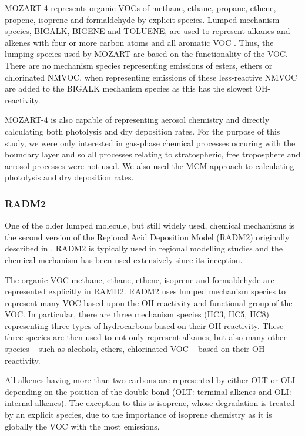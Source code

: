 MOZART-4 represents organic VOCs of methane, ethane, propane, ethene, propene, isoprene and formaldehyde by explicit species.
Lumped mechanism species, BIGALK, BIGENE and TOLUENE, are used to represent alkanes and alkenes with four or more carbon atoms and all aromatic VOC \citep{Emmons:2010}.
Thus, the lumping species used by MOZART are based on the functionality of the VOC.
There are no mechanism species representing emissions of esters, ethers or chlorinated NMVOC, when representing emissions of these less-reactive NMVOC are added to the BIGALK mechanism species as this has the slowest OH-reactivity.

MOZART-4 is also capable of representing aerosol chemistry and directly calculating both photolysis and dry deposition rates.
For the purpose of this study, we were only interested in gas-phase chemical processes occuring with the boundary layer and so all processes relating to stratospheric, free troposphere and aerosol processes were not used.
We also used the MCM approach to calculating photolysis and dry deposition rates.

\subsubsection{RADM2}
One of the older lumped molecule, but still widely used, chemical mechanisms is the second version of the Regional Acid Deposition Model (RADM2) originally described in \citet{Stockwell:1990}.
RADM2 is typically used in regional modelling studies and the chemical mechanism has been used extensively since its inception.

The organic VOC methane, ethane, ethene, isoprene and formaldehyde are represented explicitly in RAMD2.
RADM2 uses lumped mechanism species to represent many VOC based upon the OH-reactivity and functional group of the VOC.
In particular, there are three mechanism species (HC3, HC5, HC8) representing three types of hydrocarbons based on their OH-reactivity.
These three species are then used to not only represent alkanes, but also many other species -- such as alcohols, ethers, chlorinated VOC -- based on their OH-reactivity.

All alkenes having more than two carbons are represented by either OLT or OLI depending on the position of the double bond (OLT: terminal alkenes and OLI: internal alkenes).
The exception to this is isoprene, whose degradation is treated by an explicit species, due to the importance of isoprene chemistry as it is globally the VOC with the most emissions.


